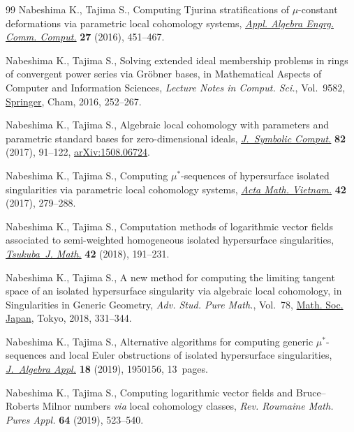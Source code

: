 \documentclass[pdftex]{sigma}%
\numberwithin{equation}{section}
\begin{document}
\begin{thebibliography}{99}
Nabeshima K., Tajima S., Computing {T}jurina stratifications of
 {$\mu$}-constant deformations via parametric local cohomology systems,
 \href{https://doi.org/10.1007/s00200-016-0289-4}{\textit{Appl. Algebra Engrg. Comm. Comput.}} \textbf{27} (2016), 451--467.

Nabeshima K., Tajima S., Solving extended ideal membership problems in rings of
 convergent power series via {G}r\"obner bases, in Mathematical Aspects of
 Computer and Information Sciences, \textit{Lecture Notes in Comput. Sci.},
 Vol.~9582, \href{https://doi.org/10.1007/978-3-319-32859-1_22}{Springer}, Cham, 2016, 252--267.

Nabeshima K., Tajima S., Algebraic local cohomology with parameters and
 parametric standard bases for zero-dimensional ideals, \href{https://doi.org/10.1016/j.jsc.2017.01.003}{\textit{J.~Symbolic
 Comput.}} \textbf{82} (2017), 91--122, \href{https://arxiv.org/abs/1508.06724}{arXiv:1508.06724}.

Nabeshima K., Tajima S., Computing {$\mu^*$}-sequences of hypersurface isolated
 singularities via parametric local cohomology systems, \href{https://doi.org/10.1007/s40306-016-0198-4}{\textit{Acta Math.
 Vietnam.}} \textbf{42} (2017), 279--288.

Nabeshima K., Tajima S., Computation methods of logarithmic vector fields
 associated to semi-weighted homogeneous isolated hypersurface singularities,
 \href{https://doi.org/10.21099/tkbjm/1554170422}{\textit{Tsukuba~J. Math.}} \textbf{42} (2018), 191--231.

Nabeshima K., Tajima S., A new method for computing the limiting tangent space
 of an isolated hypersurface singularity via algebraic local cohomology, in
 Singularities in Generic Geometry, \textit{Adv. Stud. Pure Math.}, Vol.~78,
 \href{https://doi.org/10.2969/aspm/07810331}{Math. Soc. Japan}, Tokyo, 2018, 331--344.

Nabeshima K., Tajima S., Alternative algorithms for computing generic
 {$\mu^*$}-sequences and local {E}uler obstructions of isolated hypersurface
 singularities, \href{https://doi.org/10.1142/S0219498819501561}{\textit{J.~Algebra Appl.}} \textbf{18} (2019), 1950156,
 13~pages.

Nabeshima K., Tajima S., Computing logarithmic vector fields and
 {B}ruce--{R}oberts {M}ilnor numbers {\it via} local cohomology classes,
 \textit{Rev. Roumaine Math. Pures Appl.} \textbf{64} (2019), 523--540.


\end{thebibliography}
\end{document}
